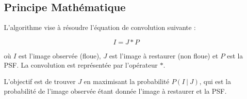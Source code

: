 \subsection{Principe Mathématique}
L'algorithme vise à résoudre l'équation de convolution suivante :

\begin{equation}
I = J \ast P
\end{equation}

où \( I \) est l'image observée (floue), \( J \) est l'image à restaurer (non floue) et \( P \) est la PSF. La convolution est représentée par l'opérateur \( \ast \).

L'objectif est de trouver \( J \) en maximisant la probabilité \( P(I \ | \ J) \), qui est la probabilité de l'image observée étant donnée l'image à restaurer et la PSF.
